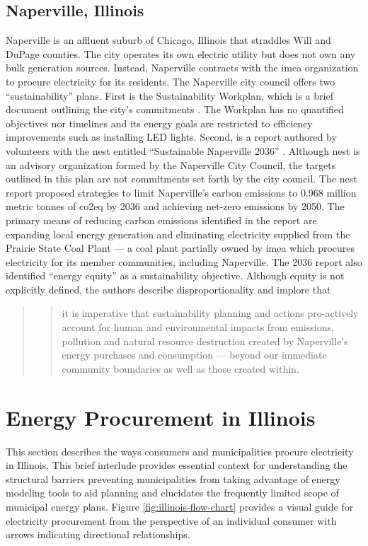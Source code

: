 \subsection{Naperville, Illinois}
Naperville is an affluent suburb of Chicago, Illinois that straddles Will and
DuPage counties. The city operates its own electric utility but does not own any
bulk generation sources. Instead, Naperville contracts with the \ac{imea}
organization to procure electricity for its residents. The Naperville city
council offers two ``sustainability'' plans. First is the Sustainability
Workplan, which is a brief document outlining the city's commitments
\cite{mjolness_city_2025}. The Workplan has no quantified objectives nor
timelines and its energy goals are restricted to efficiency improvements such as
installing LED lights. Second, is a report authored by volunteers with the
\acf{nest} entitled ``Sustainable Naperville 2036''
\cite{trendler_sustainable_2021}. Although \ac{nest} is an advisory organization
formed by the Naperville City Council, the targets outlined in this plan are not
commitments set forth by the city council. The \ac{nest} report proposed
strategies to limit Naperville's carbon emissions to 0.968 million metric tonnes
of \ac{co2eq} by 2036 and achieving net-zero emissions by 2050. The primary
means of reducing carbon emissions identified in the report are expanding local
energy generation and eliminating electricity supplied from the Prairie State
Coal Plant --- a coal plant partially owned by \ac{imea} which procures
electricity for its member communities, including Naperville. The 2036 report
also identified ``energy equity'' as a sustainability objective. Although equity
is not explicitly defined, the authors describe disproportionality and implore
that
\begin{quote}
    \blockcquote[11]{trendler_sustainable_2021}{it is imperative that
    sustainability planning and actions pro-actively account for human and
    environmental  
    impacts from emissions, pollution and natural resource destruction created
    by Naperville's energy purchases and  consumption --- beyond our immediate
    community boundaries as well as those created within.}
\end{quote}

\section{Energy Procurement in Illinois}

This section describes the ways consumers and municipalities procure electricity
in Illinois. This brief interlude provides essential context for understanding the structural barriers
preventing municipalities from taking advantage of energy modeling tools to aid
planning and elucidates the frequently limited scope of municipal energy plans.
Figure \ref{fig:illinois-flow-chart} provides a visual guide for electricity
procurement from the perspective of an individual consumer with arrows
indicating directional relationships.

